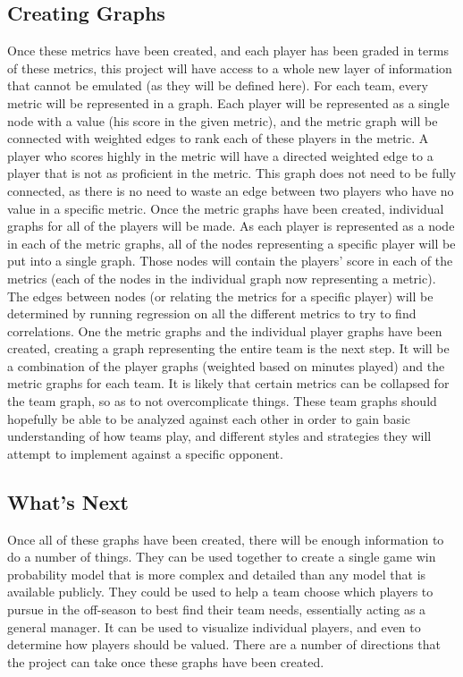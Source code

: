 \documentclass{article}
\begin{document}
\subsection{Creating Graphs}
Once these metrics have been created, and each player has been graded in terms of these metrics, this project will have access to a whole new layer of information that cannot be emulated (as they will be defined here).  For each team, every metric will be represented in a graph.  Each player will be represented as a single node with a value (his score in the given metric), and the metric graph will
be connected with weighted edges to rank each of these players in the metric.  A player who scores highly in the metric will have a directed weighted edge to a player that is not as proficient in the metric.  This graph does not need to be fully connected, as there is no need to waste an edge between two players who have no value in a specific metric.
\newline 
Once the metric graphs have been created, individual graphs for all of the players will be made.  As each player is represented as a node in each of the metric graphs, all of the nodes representing a specific player will be put into a single graph.  Those nodes will contain the players' score in each of the metrics (each of the nodes in the individual graph now representing a metric).  The edges between nodes (or relating the metrics for a specific player) will be determined by running regression on all the different metrics to try to find correlations.
\newline
One the metric graphs and the individual player graphs have been created, creating a graph representing the entire team is the next step.  It will be a combination of the player graphs (weighted based on minutes played) and the metric graphs for each team.  It is likely that certain metrics can be collapsed for the team graph, so as to not overcomplicate things.  These team graphs should hopefully be able to be analyzed against each other in order to gain basic understanding of how teams play, and different styles and strategies they will attempt to implement against a specific opponent.

\subsection{What's Next}
Once all of these graphs have been created, there will be enough information to do a number of things.  They can be used together to create a single game win probability model that is more complex and detailed than any model that is available publicly.  They could be used to help a team choose which players to pursue in the off-season to best find their team needs, essentially acting as a general manager.  It can be used to visualize individual players, and even to determine how players should be valued.  There are a number of directions that the project can take once these graphs have been created.
\end{document}
